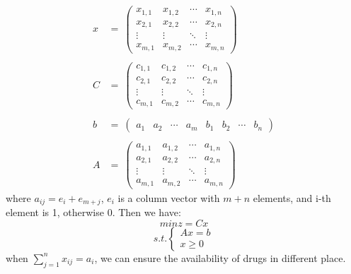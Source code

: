 $$
\begin{array}{ll}
x & = ~\begin{pmatrix}
	  x_{1,1} & x_{1,2} & \cdots & x_{1,n} \\
	  x_{2,1} & x_{2,2} & \cdots & x_{2,n} \\
	  \vdots  & \vdots  & \ddots & \vdots  \\
	  x_{m,1} & x_{m,2} & \cdots & x_{m,n}
	 \end{pmatrix}\\\\
C & = ~\begin{pmatrix}
	  c_{1,1} & c_{1,2} & \cdots & c_{1,n} \\
	  c_{2,1} & c_{2,2} & \cdots & c_{2,n} \\
	  \vdots  & \vdots  & \ddots & \vdots  \\
	  c_{m,1} & c_{m,2} & \cdots & c_{m,n}
	 \end{pmatrix}\\\\
b & = ~\begin{pmatrix}
	  a_1 & a_2 & \cdots & a_m & b_1 & b_2 & \cdots & b_n
	 \end{pmatrix}\\\\
A & = ~\begin{pmatrix}
	  a_{1,1} & a_{1,2} & \cdots & a_{1,n} \\
	  a_{2,1} & a_{2,2} & \cdots & a_{2,n} \\
	  \vdots  & \vdots  & \ddots & \vdots  \\
	  a_{m,1} & a_{m,2} & \cdots & a_{m,n}
	 \end{pmatrix}
\end{array}
$$
where $ a_{ij}=e_i+e_{m+j} $, $ e_{i} $ is a column vector with
$ m+n $ elements, and i-th element is 1, otherwise 0. Then we
have:
$$
min z=Cx
$$
$$
s.t. \left\{\begin{array}{r}
  Ax=b\\
  x\geq 0
\end{array}\right.
$$
when $ \sum_{j=1}^{n}x_{ij}=a_i $, we can ensure the
availability of drugs in different place.